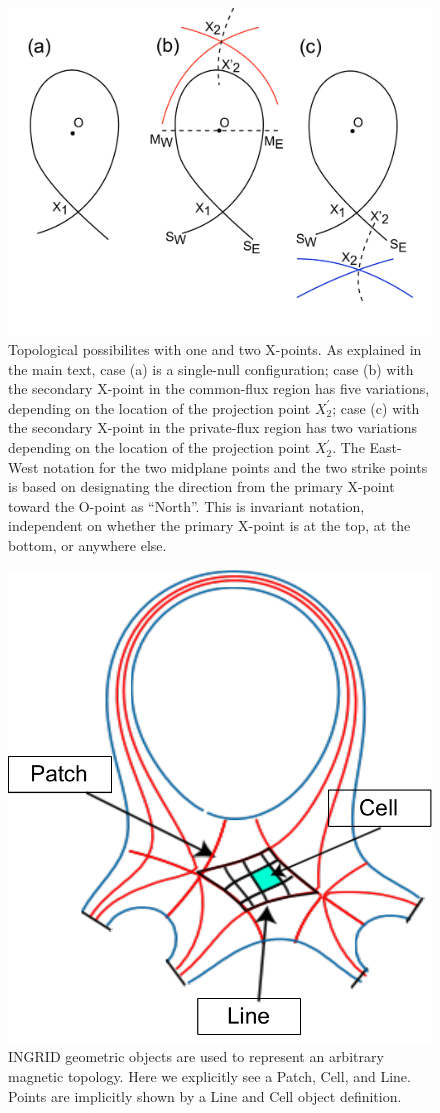 \newpage

\begin{figure}[H]
    \centering
    \includegraphics[width=\linewidth]{figures/all_conf.pdf}

    \caption{Topological possibilites with one and two X-points. As
    explained in the main text, case (a) is a single-null
    configuration; case (b) with the secondary X-point in the
    common-flux region has five variations, depending on the location
    of the projection point $X_2^{\prime}$; case (c) with the
    secondary X-point in the private-flux region has two variations
    depending on the location of the projection point $X_2^{\prime}$.
    The East-West notation for the two midplane points and the two
    strike points is based on designating the direction from the
    primary X-point toward the O-point as ``North''. This is invariant
    notation, independent on whether the primary X-point is at the
    top, at the bottom, or anywhere else.}

    \label{fig:all_conf}
\end{figure}

\begin{figure}[H]
    \centering
    \includegraphics[width=0.5\linewidth]{figures/geometry_render.pdf}  %
    \caption{\label{fig:geo_collection} INGRID geometric objects are used to represent an arbitrary magnetic topology. Here we explicitly see a Patch, Cell, and Line. Points are implicitly shown by a Line and Cell object definition.}
\end{figure}

